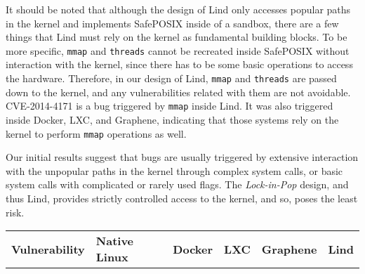 {{{It should be noted that although the design of Lind only accesses popular paths in the kernel and implements SafePOSIX inside 
of a sandbox, there are a few things that Lind must rely on the kernel as fundamental building blocks. To be more specific, 
\texttt{mmap} and \texttt{threads} cannot be recreated inside SafePOSIX without interaction with the kernel, since there has 
to be some basic operations to access the hardware. Therefore, in our design of Lind, \texttt{mmap} and \texttt{threads} 
are passed down to the kernel, and any vulnerabilities related with them are not avoidable. 
CVE-2014-4171 is a bug triggered by \texttt{mmap} inside Lind. It was also triggered inside Docker, LXC, and Graphene, indicating 
that those systems rely on the kernel to perform \texttt{mmap} operations as well.      

Our initial results suggest that bugs are usually triggered by extensive interaction with the unpopular paths in the kernel through 
complex system calls, or basic system calls
with complicated or rarely used flags. The \emph{Lock-in-Pop} design, and thus Lind,
provides strictly controlled access to the kernel, and so, poses
the least risk.



\begin{table}[h]
\scriptsize
\centering

\begin{tabular}{|p{1.7cm}|l|p{.65cm}|p{.65cm}|p{.7cm}|p{.6cm}|}\hline

\multirow{2}{1.7cm}{\bf Vulnerability}    &  \multirow{2}{.6cm}{\bf Native Linux} 
 & \multirow{2}{.6cm}{\bf Docker} & \multirow{2}{.6cm}{\bf LXC} &
\multirow{2}{1cm}{\bf Graphene} & \multirow{2}{.6cm}{\bf Lind} \\
& & & & & \\
\hline


\end{tabular}
\end{table}}}}
